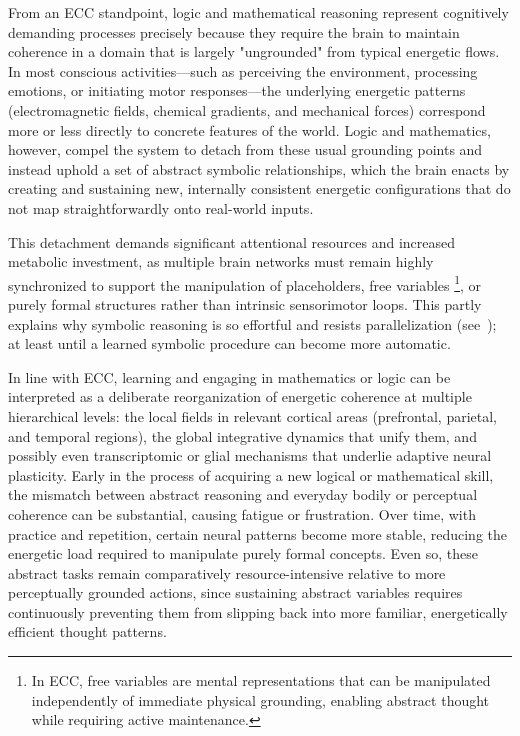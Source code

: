 From an ECC standpoint, logic and mathematical reasoning represent cognitively demanding processes precisely because they require the brain to maintain coherence in a domain that is largely "ungrounded" from typical energetic flows. In most conscious activities—such as perceiving the environment, processing emotions, or initiating motor responses—the underlying energetic patterns (electromagnetic fields, chemical gradients, and mechanical forces) correspond more or less directly to concrete features of the world. Logic and mathematics, however, compel the system to detach from these usual grounding points and instead uphold a set of abstract symbolic relationships, which the brain enacts by creating and sustaining new, internally consistent energetic configurations that do not map straightforwardly onto real-world inputs.

This detachment demands significant attentional resources and increased metabolic investment, as multiple brain networks must remain highly synchronized to support the manipulation of placeholders, free variables \footnote{In ECC, free variables are mental representations that can be manipulated independently of immediate physical grounding, enabling abstract thought while requiring active maintenance.}, or purely formal structures rather than intrinsic sensorimotor loops. This partly explains why symbolic reasoning is so effortful and resists parallelization (see~\cite{Dehaene2011, kahneman2011thinking}); at least until a learned symbolic procedure can become more automatic.

In line with ECC, learning and engaging in mathematics or logic can be interpreted as a deliberate reorganization of energetic coherence at multiple hierarchical levels: the local fields in relevant cortical areas (prefrontal, parietal, and temporal regions), the global integrative dynamics that unify them, and possibly even transcriptomic or glial mechanisms that underlie adaptive neural plasticity. Early in the process of acquiring a new logical or mathematical skill, the mismatch between abstract reasoning and everyday bodily or perceptual coherence can be substantial, causing fatigue or frustration. Over time, with practice and repetition, certain neural patterns become more stable, reducing the energetic load required to manipulate purely formal concepts. Even so, these abstract tasks remain comparatively resource-intensive relative to more perceptually grounded actions, since sustaining abstract variables requires continuously preventing them from slipping back into more familiar, energetically efficient thought patterns.

